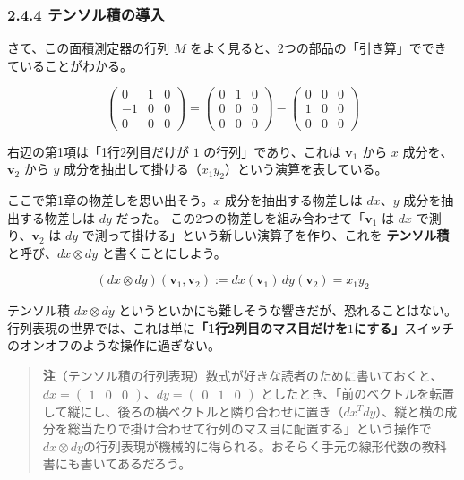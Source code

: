 \documentclass[a4paper,12pt,openany]{book}
\begin{document}
\hypertarget{ux30c6ux30f3ux30bdux30ebux7a4dux306eux5c0eux5165}{%
\subsubsection{2.4.4
テンソル積の導入}\label{ux30c6ux30f3ux30bdux30ebux7a4dux306eux5c0eux5165}}

さて、この面積測定器の行列 \(M\)
をよく見ると、2つの部品の「引き算」でできていることがわかる。

\[
\begin{pmatrix} 0 & 1 & 0 \\ -1 & 0 & 0 \\ 0 & 0 & 0 \end{pmatrix}
= \begin{pmatrix} 0 & 1 & 0 \\ 0 & 0 & 0 \\ 0 & 0 & 0 \end{pmatrix} - 
 \begin{pmatrix} 0 & 0 & 0 \\ 1 & 0 & 0 \\ 0 & 0 & 0 \end{pmatrix}
\]

右辺の第1項は「1行2列目だけが \(1\) の行列」であり、これは
\(\mathbf{v}_1\) から \(x\) 成分を、\(\mathbf{v}_2\) から \(y\)
成分を抽出して掛ける（\(x_1 y_2\)）という演算を表している。

ここで第1章の物差しを思い出そう。\(x\) 成分を抽出する物差しは
\(dx\)、\(y\) 成分を抽出する物差しは \(dy\) だった。
この2つの物差しを組み合わせて「\(\mathbf{v}_1\) は \(dx\)
で測り、\(\mathbf{v}_2\) は \(dy\)
で測って掛ける」という新しい演算子を作り、これを \textbf{テンソル積}
と呼び、\(dx \otimes dy\) と書くことにしよう。

\[(dx \otimes dy)(\mathbf{v}_1, \mathbf{v}_2) := dx(\mathbf{v}_1)\,dy(\mathbf{v}_2) = x_1 y_2\]

テンソル積 \(dx \otimes dy\)
というといかにも難しそうな響きだが、恐れることはない。行列表現の世界では、これは単に\textbf{「1行2列目のマス目だけを}\(1\)\textbf{にする」}スイッチのオンオフのような操作に過ぎない。

\begin{quote}
\textbf{注}（テンソル積の行列表現）数式が好きな読者のために書いておくと、\(dx = \begin{pmatrix} 1 & 0 & 0 \end{pmatrix}\)、\(dy = \begin{pmatrix} 0 & 1 & 0 \end{pmatrix}\)
としたとき、「前のベクトルを転置して縦にし、後ろの横ベクトルと隣り合わせに置き（\(dx^T dy\)）、縦と横の成分を総当たりで掛け合わせて行列のマス目に配置する」という操作で\(dx \otimes dy\)の行列表現が機械的に得られる。おそらく手元の線形代数の教科書にも書いてあるだろう。
\end{quote}
\end{document}
